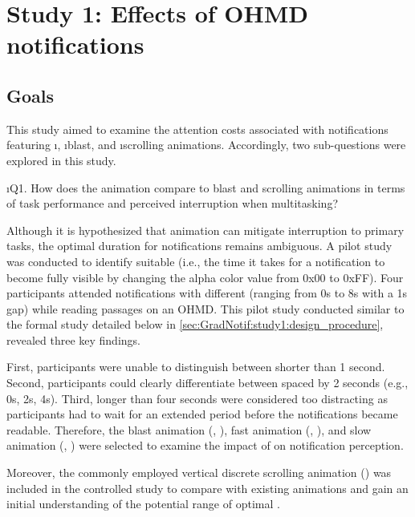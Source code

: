 \section{Study 1: Effects of \fading{} OHMD notifications}
\label{sec:GradNotif:study1}


\subsection{Goals}
\label{study1:sec:GradNotif:goals}

This study aimed to examine the attention costs associated with notifications featuring \i{\fading{}}, \i{blast}, and \i{scrolling} animations. Accordingly, two sub-questions were explored in this study.

\i{Q1. How does the \fading{} animation compare to blast and scrolling animations in terms of task performance and perceived interruption when multitasking?} 

Although it is hypothesized that \fading{} animation can mitigate interruption to primary tasks, the optimal duration for \fading{} notifications remains ambiguous. A pilot study was conducted to identify suitable  (i.e., the time it takes for a notification to become fully visible by changing the alpha color value from 0x00 to 0xFF). Four participants attended notifications with different  (ranging from 0s to 8s with a 1s gap) while reading passages on an OHMD. This pilot study conducted similar to the formal study detailed below in \autoref{sec:GradNotif:study1:design_procedure}, revealed three key findings.

First, participants were unable to distinguish between  shorter than 1 second. Second, participants could clearly differentiate between  spaced by 2 seconds (e.g., 0s, 2s, 4s). Third,  longer than four seconds were considered too distracting as participants had to wait for an extended period before the notifications became readable. Therefore, the blast animation (\instant{}, ), fast \fading{} animation (\fastfade{}, ), and slow \fading{} animation (\slowfade{}, ) were selected to examine the impact of \fadeduration{} on notification perception.

Moreover, the commonly employed vertical discrete scrolling animation (\scroll{}) \cite{android_android_2021, maglio_tradeoffs_2000, mccrickard_evaluating_2001} was included in the controlled study to compare \fading{} with existing animations and gain an initial understanding of the potential range of optimal \fadeduration{}.



